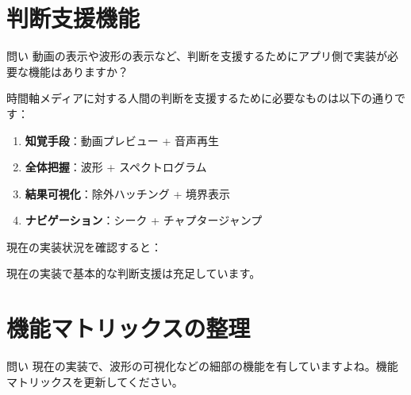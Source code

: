 \documentclass[10pt,a4paper,twocolumn]{ltjsarticle}
\begin{document}
\section{判断支援機能}

\begin{itembox}[l]{問い}
動画の表示や波形の表示など、判断を支援するためにアプリ側で実装が必要な機能はありますか？
\end{itembox}

時間軸メディアに対する人間の判断を支援するために必要なものは以下の通りです：

\begin{enumerate}
\item \textbf{知覚手段}：動画プレビュー + 音声再生
\item \textbf{全体把握}：波形 + スペクトログラム
\item \textbf{結果可視化}：除外ハッチング + 境界表示
\item \textbf{ナビゲーション}：シーク + チャプタージャンプ
\end{enumerate}

現在の実装状況を確認すると：

\vspace{0.5\baselineskip}
\vspace{0.5\baselineskip}

現在の実装で基本的な判断支援は充足しています。

\section{機能マトリックスの整理}

\begin{itembox}[l]{問い}
現在の実装で、波形の可視化などの細部の機能を有していますよね。機能マトリックスを更新してください。
\end{itembox}
\end{document}
